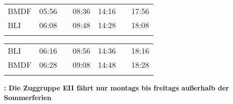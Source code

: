 \begin{center}
\begin{tabular}
\begin{tabular}
\begin{tabular}
\myhline
\end{tabular}
\fi
\ifeiche
\begin{tabular}{!{\color{pastellorange}\vrule width 3pt}l!{\color{pastellorange}\vrule width 3pt}*{5}{c|}c!{\color{pastellorange}\vrule width 3pt}}
\hline
{}
 \\
\hline
BMDF     &
05:56 &  & 08:36 & 14:16 &  & 17:56 \\
BLI      &
06:08 & \por{}   & 08:48 & 14:28 & \por{}   & 18:08 \\
\myhline
\end{tabular}
\begin{tabular}{!{\color{pastellorange}\vrule width 3pt}l!{\color{pastellorange}\vrule width 3pt}*{5}{c|}c!{\color{pastellorange}\vrule width 3pt}}
\hline
{}
 \\
\hline
BLI      &
06:16 &  & 08:56 & 14:36 &  & 18:16 \\
BMDF     &
06:28 & \por{}   & 09:08 & 14:48 & \por{}   & 18:28 \\
\myhline
\end{tabular}

{\bfseries *: Die Zuggruppe EII fährt nur montags bis freitags außerhalb der Sommerferien}
\fi


\end{tabular}
\end{tabular}
\end{center}
